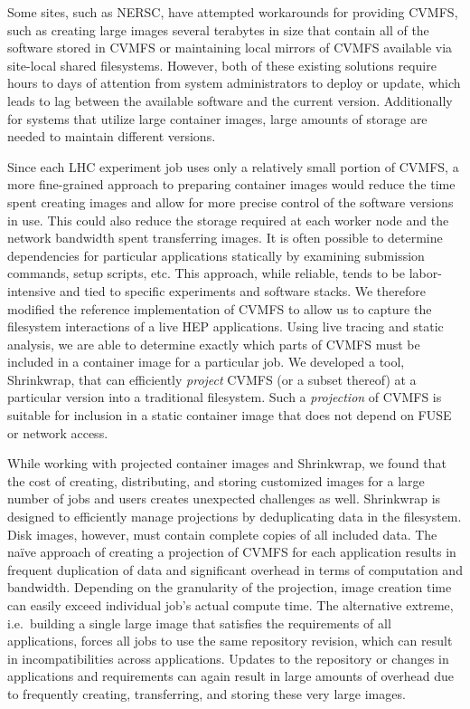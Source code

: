 \documentclass[conference]{IEEEtran}
\begin{document}
Some sites, such as NERSC,
have attempted workarounds for providing CVMFS,
such as creating large images several terabytes in size that contain all of the software stored in CVMFS or
maintaining local mirrors of CVMFS available via site-local shared filesystems.
However, both of these existing solutions require 
hours to days of attention from system administrators to deploy or update,
which leads to lag between the available software and the current version.
Additionally for systems that utilize large container images, large amounts of storage are needed to maintain different versions.

Since each LHC experiment job uses 
only a relatively small portion of CVMFS,
a more fine-grained approach to preparing container images would reduce the time spent creating images and allow for more precise control of the software versions in use.
This could also reduce the storage required at each worker node and the network bandwidth spent transferring images.
It is often possible to determine dependencies for particular applications statically by examining submission commands, setup scripts, etc.
This approach, while reliable, tends to be labor-intensive and tied to specific experiments and software stacks.
We therefore modified the reference implementation of CVMFS to allow us to capture the filesystem interactions of a live HEP applications.
Using live tracing and static analysis,
we are able to determine exactly which parts of CVMFS must be included in a container image for a particular job.
We developed a tool, Shrinkwrap, that can efficiently \emph{project} CVMFS (or a subset thereof) at a particular version into a traditional filesystem.
Such a \emph{projection} of CVMFS is suitable for inclusion in a static container image that does not depend on FUSE or network access.

While working with projected container images and Shrinkwrap,
we found that the cost of creating, distributing, and storing customized images for a large number of jobs and users creates unexpected challenges as well.
Shrinkwrap is designed to efficiently manage projections by deduplicating data in the filesystem.
Disk images, however, must contain complete copies of all included data.
The na\"{i}ve approach of creating a projection of CVMFS for each application results in frequent duplication of data and significant overhead in terms of computation and bandwidth.
Depending on the granularity of the projection,
image creation time can easily exceed individual job's actual compute time.
The alternative extreme, i.e.\ building a single large image that satisfies the requirements of all applications,
forces all jobs to use the same repository revision,
which can result in incompatibilities across applications.
Updates to the repository or changes in applications and requirements can again result in large amounts of overhead due to frequently creating, transferring, and storing these very large images.
\end{document}
